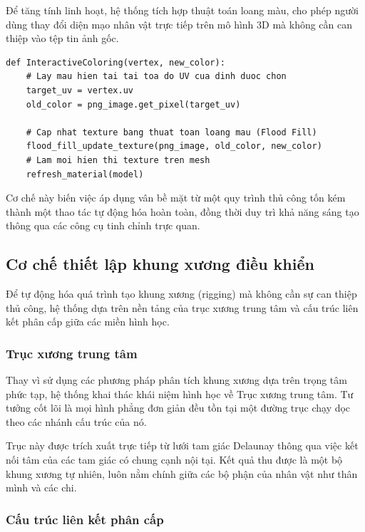 \documentclass{report}
\newenvironment{graycode}
{\begin{mdframed}[backgroundcolor=light-gray, linecolor=light-gray, roundcorner=5pt]}
{\end{mdframed}}
\begin{document}
Để tăng tính linh hoạt, hệ thống tích hợp thuật toán loang màu, cho phép người dùng thay đổi diện mạo nhân vật trực tiếp trên mô hình 3D mà không cần can thiệp vào tệp tin ảnh gốc.

\begin{graycode}
\begin{lstlisting}[caption=Mã giả hiệu chỉnh màu sắc tương tác]
def InteractiveColoring(vertex, new_color):
    # Lay mau hien tai tai toa do UV cua dinh duoc chon
    target_uv = vertex.uv
    old_color = png_image.get_pixel(target_uv)
    
    # Cap nhat texture bang thuat toan loang mau (Flood Fill)
    flood_fill_update_texture(png_image, old_color, new_color)
    # Lam moi hien thi texture tren mesh
    refresh_material(model)
\end{lstlisting}
\end{graycode}

Cơ chế này biến việc áp dụng vân bề mặt từ một quy trình thủ công tốn kém thành một thao tác tự động hóa hoàn toàn, đồng thời duy trì khả năng sáng tạo thông qua các công cụ tinh chỉnh trực quan.

\subsection{Cơ chế thiết lập khung xương điều khiển}

Để tự động hóa quá trình tạo khung xương (rigging) mà không cần sự can thiệp thủ công, hệ thống dựa trên nền tảng của trục xương trung tâm và cấu trúc liên kết phân cấp giữa các miền hình học.

\subsubsection{Trục xương trung tâm}

Thay vì sử dụng các phương pháp phân tích khung xương dựa trên trọng tâm phức tạp, hệ thống khai thác khái niệm hình học về Trục xương trung tâm. Tư tưởng cốt lõi là mọi hình phẳng đơn giản đều tồn tại một đường trục chạy dọc theo các nhánh cấu trúc của nó.

Trục này được trích xuất trực tiếp từ lưới tam giác Delaunay thông qua việc kết nối tâm của các tam giác có chung cạnh nội tại. Kết quả thu được là một bộ khung xương tự nhiên, luôn nằm chính giữa các bộ phận của nhân vật như thân mình và các chi.

\subsubsection{Cấu trúc liên kết phân cấp}
\end{document}
